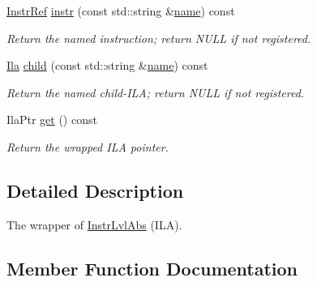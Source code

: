 \begin{DoxyCompactItemize}
\mbox{\label{classilang_1_1_ila_aa22f7d8ff1692c2267f5b41a06c383be}} 
\mbox{\hyperlink{classilang_1_1_instr_ref}{Instr\+Ref}} \mbox{\hyperlink{classilang_1_1_ila_aa22f7d8ff1692c2267f5b41a06c383be}{instr}} (const std\+::string \&\mbox{\hyperlink{classilang_1_1_ila_aef59c0b294a99f65ce5dccef8dd1ccb7}{name}}) const
\begin{DoxyCompactList}\small\item\em Return the named instruction; return N\+U\+LL if not registered. \end{DoxyCompactList}\item 
\mbox{\label{classilang_1_1_ila_a01e323477e1d6c6954a3b73df3da02ac}} 
\mbox{\hyperlink{classilang_1_1_ila}{Ila}} \mbox{\hyperlink{classilang_1_1_ila_a01e323477e1d6c6954a3b73df3da02ac}{child}} (const std\+::string \&\mbox{\hyperlink{classilang_1_1_ila_aef59c0b294a99f65ce5dccef8dd1ccb7}{name}}) const
\begin{DoxyCompactList}\small\item\em Return the named child-\/\+I\+LA; return N\+U\+LL if not registered. \end{DoxyCompactList}\item 
\mbox{\label{classilang_1_1_ila_a69736aa320c68e4eb7d80c6a083af55f}} 
Ila\+Ptr \mbox{\hyperlink{classilang_1_1_ila_a69736aa320c68e4eb7d80c6a083af55f}{get}} () const
\begin{DoxyCompactList}\small\item\em Return the wrapped I\+LA pointer. \end{DoxyCompactList}\end{DoxyCompactItemize}


\subsection{Detailed Description}
The wrapper of \mbox{\hyperlink{classilang_1_1_instr_lvl_abs}{Instr\+Lvl\+Abs}} (I\+LA). 

\subsection{Member Function Documentation}
\mbox{\label{classilang_1_1_ila_a38d066e8093e5b84b3cd26dda72a50b2}} 
